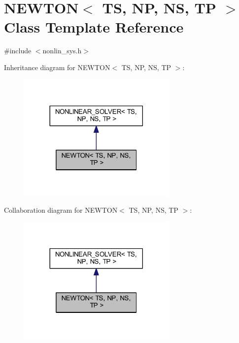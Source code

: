 \hypertarget{class_n_e_w_t_o_n}{}\section{N\+E\+W\+T\+ON$<$ TS, NP, NS, TP $>$ Class Template Reference}
\label{class_n_e_w_t_o_n}


{\ttfamily \#include $<$nonlin\+\_\+sys.\+h$>$}



Inheritance diagram for N\+E\+W\+T\+ON$<$ TS, NP, NS, TP $>$\+:\nopagebreak
\begin{figure}[H]
\begin{center}
\leavevmode
\includegraphics[width=221pt]{class_n_e_w_t_o_n__inherit__graph}
\end{center}
\end{figure}


Collaboration diagram for N\+E\+W\+T\+ON$<$ TS, NP, NS, TP $>$\+:\nopagebreak
\begin{figure}[H]
\begin{center}
\leavevmode
\includegraphics[width=221pt]{class_n_e_w_t_o_n__coll__graph}
\end{center}
\end{figure}
